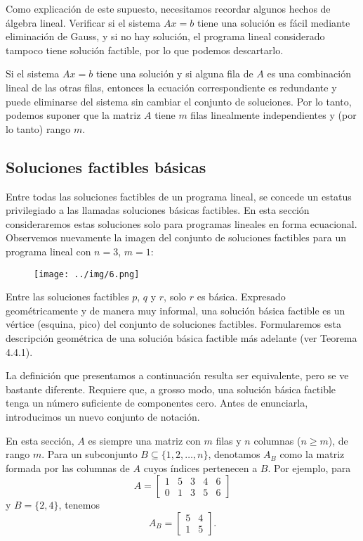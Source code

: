 \documentclass{article}
\begin{document}
Como explicación de este supuesto, necesitamos recordar algunos hechos de álgebra lineal. Verificar si el sistema \( Ax = b \) tiene una solución es fácil mediante eliminación de Gauss, y si no hay solución, el programa lineal considerado tampoco tiene solución factible, por lo que podemos descartarlo.

Si el sistema \( Ax = b \) tiene una solución y si alguna fila de \( A \) es una combinación lineal de las otras filas, entonces la ecuación correspondiente es redundante y puede eliminarse del sistema sin cambiar el conjunto de soluciones. Por lo tanto, podemos suponer que la matriz \( A \) tiene \( m \) filas linealmente independientes y (por lo tanto) rango \( m \).


\newpage 
\subsection{Soluciones factibles básicas}
Entre todas las soluciones factibles de un programa lineal, se concede un estatus privilegiado a las llamadas soluciones básicas factibles. En esta sección consideraremos estas soluciones solo para programas lineales en forma ecuacional. Observemos nuevamente la imagen del conjunto de soluciones factibles para un programa lineal con \( n = 3 \), \( m = 1 \):

\begin{figure}[H] %
\centering %
\texttt{[image: ../img/6.png]} %
\label{fig:imagen} %
\end{figure}

Entre las soluciones factibles \( p \), \( q \) y \( r \), solo \( r \) es básica. Expresado geométricamente y de manera muy informal, una solución básica factible es un vértice (esquina, pico) del conjunto de soluciones factibles. Formularemos esta descripción geométrica de una solución básica factible más adelante (ver Teorema 4.4.1).

La definición que presentamos a continuación resulta ser equivalente, pero se ve bastante diferente. Requiere que, a grosso modo, una solución básica factible tenga un número suficiente de componentes cero. Antes de enunciarla, introducimos un nuevo conjunto de notación.

En esta sección, \( A \) es siempre una matriz con \( m \) filas y \( n \) columnas (\( n \geq m \)), de rango \( m \). Para un subconjunto \( B \subseteq \{1, 2, \ldots, n\} \), denotamos \( A_B \) como la matriz formada por las columnas de \( A \) cuyos índices pertenecen a \( B \). Por ejemplo, para
\[
A =
\begin{bmatrix}
1 & 5 & 3 & 4 & 6 \\
0 & 1 & 3 & 5 & 6
\end{bmatrix}
\]
y \( B = \{2, 4\} \), tenemos
\[
A_B =
\begin{bmatrix}
5 & 4 \\
1 & 5
\end{bmatrix}.
\]
\end{document}
